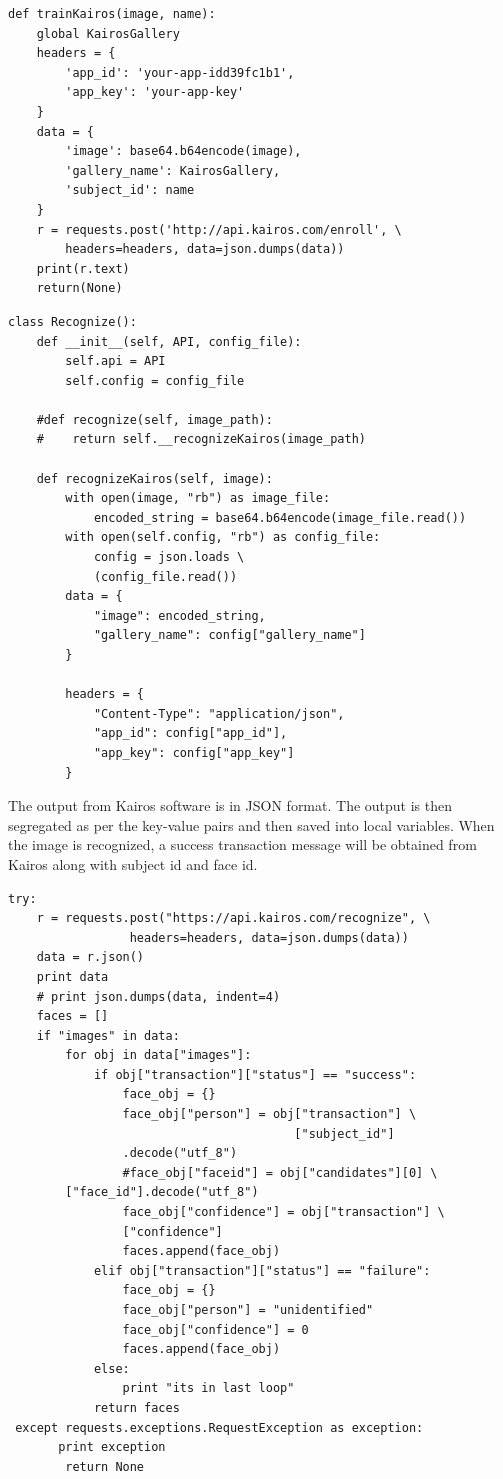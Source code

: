 \documentclass[sigconf]{acmart}
\begin{document}
\begin{verbatim}
def trainKairos(image, name):
    global KairosGallery
    headers = {
        'app_id': 'your-app-idd39fc1b1',
        'app_key': 'your-app-key'
    }
    data = {
        'image': base64.b64encode(image),
        'gallery_name': KairosGallery,
        'subject_id': name
    }
    r = requests.post('http://api.kairos.com/enroll', \ 
        headers=headers, data=json.dumps(data))
    print(r.text)
    return(None)
\end{verbatim}

\begin{verbatim}
class Recognize():
    def __init__(self, API, config_file):
        self.api = API
        self.config = config_file

    #def recognize(self, image_path):
    #    return self.__recognizeKairos(image_path)
    
    def recognizeKairos(self, image):
        with open(image, "rb") as image_file:
            encoded_string = base64.b64encode(image_file.read())
        with open(self.config, "rb") as config_file:
            config = json.loads \ 
            (config_file.read())
        data = {
            "image": encoded_string,
            "gallery_name": config["gallery_name"]
        }

        headers = {
            "Content-Type": "application/json",
            "app_id": config["app_id"],
            "app_key": config["app_key"]
        }
\end{verbatim}

The output from Kairos software is in JSON format. The output is then segregated as per the key-value pairs and then saved into local variables. When the image is recognized, a success transaction message will be obtained from Kairos along with subject id and face id.

\begin{verbatim}
try:
    r = requests.post("https://api.kairos.com/recognize", \ 
                 headers=headers, data=json.dumps(data))
    data = r.json()
    print data
    # print json.dumps(data, indent=4)
    faces = []
    if "images" in data:
        for obj in data["images"]:
            if obj["transaction"]["status"] == "success":
                face_obj = {}
                face_obj["person"] = obj["transaction"] \ 
                                        ["subject_id"]
                .decode("utf_8")
                #face_obj["faceid"] = obj["candidates"][0] \ 
		["face_id"].decode("utf_8")
                face_obj["confidence"] = obj["transaction"] \ 
                ["confidence"]
                faces.append(face_obj)
            elif obj["transaction"]["status"] == "failure":
                face_obj = {}
                face_obj["person"] = "unidentified"
                face_obj["confidence"] = 0
                faces.append(face_obj)
            else:
                print "its in last loop"
            return faces
 except requests.exceptions.RequestException as exception:
       print exception
        return None
\end{verbatim}    
\end{document}
